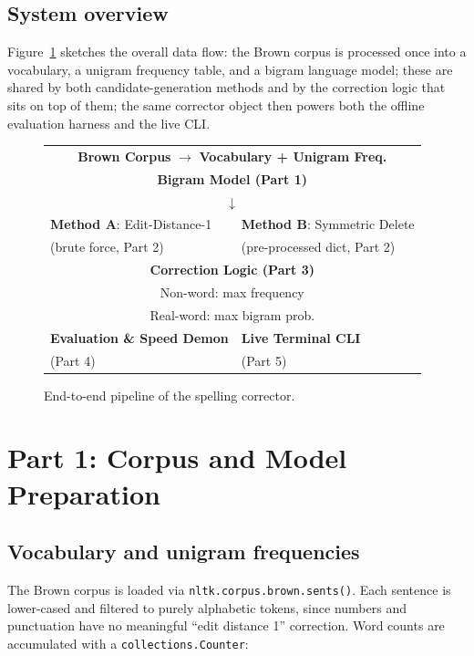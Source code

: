 \documentclass[11pt]{article}
\begin{document}
\subsection{System overview}

Figure~\ref{fig:pipeline} sketches the overall data flow: the Brown corpus is processed once into a vocabulary, a unigram frequency table, and a bigram language model; these are shared by both candidate-generation methods and by the correction logic that sits on top of them; the same corrector object then powers both the offline evaluation harness and the live CLI.

\begin{figure}[H]
\centering
\begin{tabular}{|p{}|p{}|}
\hline
\multicolumn{2}{|c|}{\textbf{Brown Corpus} $\rightarrow$ \textbf{Vocabulary + Unigram Freq.}} \\
\multicolumn{2}{|c|}{\textbf{Bigram Model (Part 1)}} \\
\hline
\multicolumn{2}{|c|}{$\downarrow$} \\
\hline
\textbf{Method A}: Edit-Distance-1 & \textbf{Method B}: Symmetric Delete \\
(brute force, Part 2) & (pre-processed dict, Part 2) \\
\hline
\multicolumn{2}{|c|}{\textbf{Correction Logic (Part 3)}} \\
\multicolumn{2}{|c|}{Non-word: max frequency} \\
\multicolumn{2}{|c|}{Real-word: max bigram prob.} \\
\hline
\textbf{Evaluation \& Speed Demon} & \textbf{Live Terminal CLI} \\
(Part 4) & (Part 5) \\
\hline
\end{tabular}
\caption{End-to-end pipeline of the spelling corrector.}
\label{fig:pipeline}
\end{figure}

\section{Part 1: Corpus and Model Preparation}

\subsection{Vocabulary and unigram frequencies}

The Brown corpus is loaded via \texttt{nltk.corpus.brown.sents()}. Each sentence is lower-cased and filtered to purely alphabetic tokens, since numbers and punctuation have no meaningful ``edit distance 1'' correction. Word counts are accumulated with a \texttt{collections.Counter}:
\end{document}

